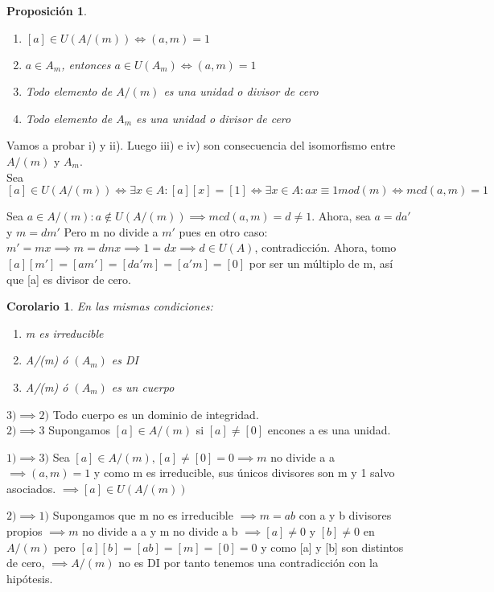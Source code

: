 \documentclass[11pt, a4paper, titlepage]{article}
\makeatletter
\renewenvironment{proof}[1][\proofname] {\vspace{-15pt}\par\pushQED{\qed}\normalfont\topsep6\p@\@plus6\p@\relax\trivlist\item[\hskip\labelsep\it#1\@addpunct{.}]\ignorespaces}{\popQED\endtrivlist\@endpefalse}
\theoremstyle{theorem-style}
\newtheorem*{nprop}{Proposición}
\newtheorem{ncor}{Corolario}
\theoremstyle{definition-style}
\theoremstyle{remark-style}
\theoremstyle{example-style}
\newenvironment{nlist}
{\begin{enumerate}
\renewcommand\labelenumi{(\emph{\roman{enumi})}}}
{\end{enumerate}}
\makeatother
\begin{document}
\begin{nprop}
	\begin{nlist}
	\item $[a] \in U(A/(m)) \iff (a,m) = 1 $
	\item $a \in A_m$, entonces $a \in U(A_m) \iff (a,m) = 1$
	\item Todo elemento de $A/(m)$ es una unidad o divisor de cero
	\item Todo elemento de $A_m$ es una unidad o divisor de cero
\end{nlist}
\end{nprop}
\begin{proof}
	Vamos a probar i) y ii). Luego iii) e iv) son consecuencia del isomorfismo entre $A/(m)$ y $A_m$.\\
	Sea $[a] \in U(A/(m)) \iff \exists x \in A: [a][x] = [1] \iff \exists x \in A : ax \equiv 1mod(m) \iff mcd(a,m) = 1$
	
	Sea $a \in A/(m) : a \notin U(A/(m)) \implies mcd(a,m) = d \ne 1$. Ahora, sea $a = da'$ y $m=dm'$
	Pero m no divide a $m'$ pues en otro caso: $m'=mx \implies m = dmx \implies 1 = dx \implies d \in U(A)$, contradicción.
	Ahora, tomo $[a][m'] = [am'] = [da'm] = [a'm] = [0]$ por ser un múltiplo de m, así que [a] es divisor de cero.
\end{proof}

\begin{ncor}
	En las mismas condiciones:
	
	\begin{nlist}
	\item m es irreducible
	\item A/(m) ó $(A_m)$ es DI
	\item A/(m) ó $(A_m)$ es un cuerpo
\end{nlist}
\end{ncor}
\begin{proof}
	$\boxed{3) \implies 2)}$ Todo cuerpo es un dominio de integridad.\\
	$\boxed{2) \implies 3}$ Supongamos $[a] \in A/(m) $ si $[a] \ne [0]$ encones a es una unidad.
	
	$\boxed{1) \implies 3)}$ Sea $[a] \in A/(m), [a] \ne [0] = 0 \implies m$ no divide a a $\implies (a,m) = 1$ y como m es irreducible, sus únicos divisores son m y 1 salvo asociados. $\implies [a] \in U(A/(m))$
	
	$\boxed{2)\implies 1)}$ Supongamos que m no es irreducible $\implies m = ab$ con a y b divisores propios $\implies m$ no divide a a y m no divide a b $\implies [a] \ne 0 $ y $[b] \ne 0$ en $A/(m)$ pero $[a][b] = [ab] = [m] = [0] = 0$ y como [a] y [b] son distintos de cero, $\implies A/(m)$ no es DI por tanto tenemos una contradicción con la hipótesis.
\end{proof}
\end{document}
